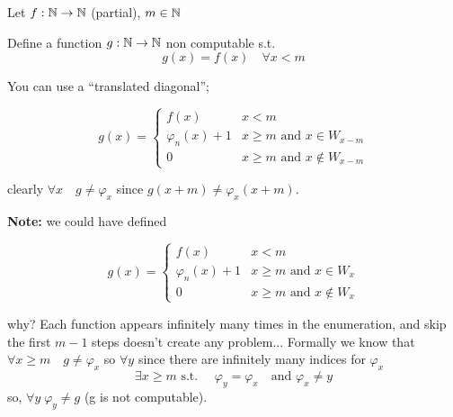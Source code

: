 \begin{exercise}
  Let $f: \mathbb{N} \rightarrow \mathbb{N}$ (partial), $m \in \mathbb{N}$

  Define a function $g : \mathbb{N} \rightarrow \mathbb{N}$ non computable
  s.t. \[g(x) = f(x) \quad \forall x < m\]

  You can use a ``translated diagonal'';


  \[
    g(x) = \begin{cases}
      f(x) & x < m \\
      \varphi_n(x) + 1 & x \geq m \mbox{ and } x \in W_{x-m} \\
      0 & x \geq m \mbox{ and } x \notin W_{x-m}
    \end{cases}
  \]

  clearly $\forall x \quad g\neq \varphi_x$ since
  $g(x + m) \neq \varphi_x(x+m)$.

  \textbf{Note:} we could have defined

  \[
    g(x) = \begin{cases}
      f(x) & x < m \\
      \varphi_n(x) + 1 & x \geq m \mbox{ and } x \in W_{x} \\
      0 & x \geq m \mbox{ and } x \notin W_{x}
    \end{cases}
  \]

  why? Each function appears infinitely many times in the enumeration,
  and skip the first $m-1$ steps doesn't create any
  problem... Formally we know that
  $\forall x \geq m \quad g \neq \varphi_x$ so $\forall y$ since there
  are infinitely many indices for $\varphi_x$
  \[\exists x \geq m \mbox{ s.t. } \quad \varphi_y = \varphi_x \quad
    \mbox{and } \varphi_x \neq y\] so, $\forall y \; \varphi_y \neq g$
  (g is not computable).
\end{exercise}


